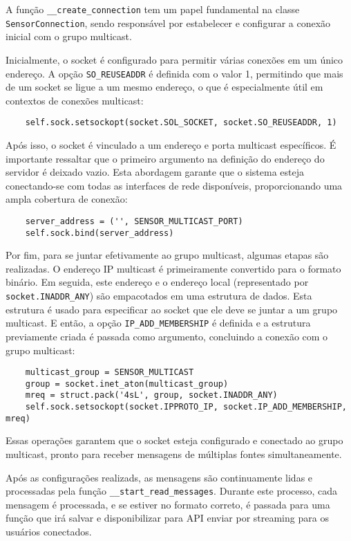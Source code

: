 A função \texttt{\_\_create\_connection} tem um papel fundamental na classe \texttt{SensorConnection}, sendo responsável por estabelecer e configurar a conexão inicial com o grupo multicast.

Inicialmente, o socket é configurado para permitir várias conexões em um único endereço. A opção \texttt{SO\_REUSEADDR} é definida com o valor 1, permitindo que mais de um socket se ligue a um mesmo endereço, o que é especialmente útil em contextos de conexões multicast:

\begin{verbatim}
    self.sock.setsockopt(socket.SOL_SOCKET, socket.SO_REUSEADDR, 1)
\end{verbatim}

Após isso, o socket é vinculado a um endereço e porta multicast específicos. É importante ressaltar que o primeiro argumento na definição do endereço do servidor é deixado vazio. Esta abordagem garante que o sistema esteja conectando-se com todas as interfaces de rede disponíveis, proporcionando uma ampla cobertura de conexão:

\begin{verbatim}
    server_address = ('', SENSOR_MULTICAST_PORT)
    self.sock.bind(server_address)
\end{verbatim}

Por fim, para se juntar efetivamente ao grupo multicast, algumas etapas são realizadas. O endereço IP multicast é primeiramente convertido para o formato binário. Em seguida, este endereço e o endereço local (representado por \texttt{socket.INADDR\_ANY}) são empacotados em uma estrutura de dados. Esta estrutura é usado para especificar ao socket que ele deve se juntar a um grupo multicast. E então, a opção \texttt{IP\_ADD\_MEMBERSHIP} é definida e a estrutura previamente criada é passada como argumento, concluindo a conexão com o grupo multicast:

\begin{verbatim}
    multicast_group = SENSOR_MULTICAST
    group = socket.inet_aton(multicast_group)
    mreq = struct.pack('4sL', group, socket.INADDR_ANY)
    self.sock.setsockopt(socket.IPPROTO_IP, socket.IP_ADD_MEMBERSHIP, mreq)
\end{verbatim}

Essas operações garantem que o socket esteja configurado e conectado ao grupo multicast, pronto para receber mensagens de múltiplas fontes simultaneamente.

Após as configurações realizads, as mensagens são continuamente lidas e processadas pela função \texttt{\_\_start\_read\_messages}. Durante este processo, cada mensagem é processada, e se estiver no formato correto, é passada para uma função que irá salvar e disponibilizar para API enviar por streaming para os usuários conectados.

